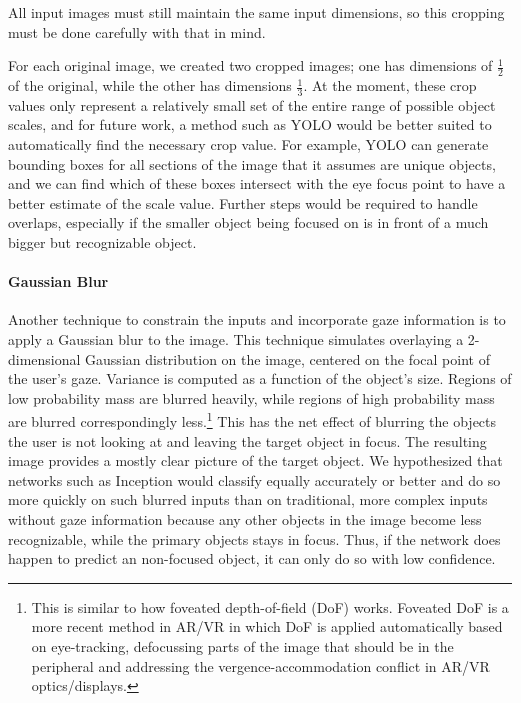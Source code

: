 All input images must still maintain the same input dimensions, so this cropping
must be done carefully with that in mind.

For each original image, we created two cropped images; one has dimensions
of \(\frac{1}{2}\) of the original, while the other has dimensions
\(\frac{1}{3}\). At the moment, these crop values only represent a relatively small set of the entire range of possible object scales, and for future work, a method such as YOLO would be better suited to automatically find the necessary crop value. For example, YOLO can generate bounding boxes for all sections of the image that it assumes are unique objects, and we can find which of these boxes intersect with the eye focus point to have a better estimate of the scale value. Further steps would be required to handle overlaps, especially if the smaller object being focused on is in front of a much bigger but recognizable object.

\paragraph{Gaussian Blur}

Another technique to constrain the inputs and incorporate gaze information is to
apply a Gaussian blur to the image. This technique simulates overlaying a
2-dimensional Gaussian distribution on the image, centered on the focal point of
the user's gaze. Variance is computed as a function of the object's size.
Regions of low probability mass are blurred heavily, while regions of high
probability mass are blurred correspondingly less.\footnote{This is similar to
how foveated depth-of-field (DoF) works. Foveated DoF is a more recent
method in AR/VR in which DoF is applied automatically based on
eye-tracking, defocussing parts of the image that should be in the peripheral and addressing the vergence-accommodation conflict in AR/VR optics/displays.} This has the net effect of blurring the objects the user is not
looking at and leaving the target object in focus. The resulting image provides
a mostly clear picture of the target object. We hypothesized that networks such
as Inception would classify equally accurately or better and do so more quickly
on such blurred inputs than on traditional, more complex inputs without gaze
information because any other objects in the image become less recognizable,
while the primary objects stays in focus. Thus, if the network does happen to predict an non-focused object, it can only do so with low confidence.

